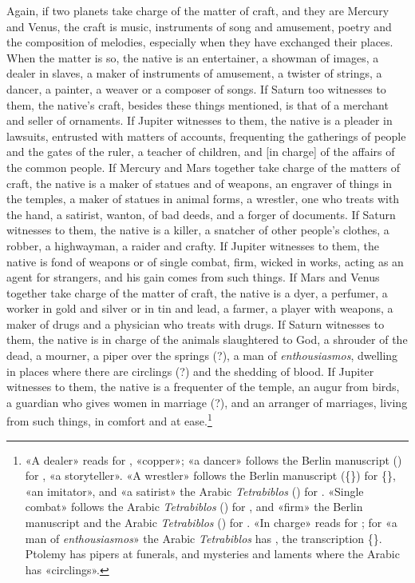 \documentclass[11pt]{article}
\newcommand{\Fol}[1]{\marginpar{\footnotesize\color{gray}f.\,#1}}
\begin{document}
\par \Fol{66r}Again, if two planets take charge of the matter of craft, and they are Mercury and Venus, the craft is music, instruments of song and amusement, poetry and the composition of melodies, especially when they have exchanged their places. When the matter is so, the native is an entertainer, a showman of images, a dealer in slaves, a maker of instruments of amusement, a twister of strings, a dancer, a painter, a weaver or a composer of songs. If Saturn too witnesses to them, the native's craft, besides these things mentioned, is that of a merchant and seller of ornaments. If Jupiter witnesses to them, the native is a pleader in lawsuits, entrusted with matters of accounts, frequenting the gatherings of people and the gates of the ruler, a teacher of children, and [in charge] of the affairs of the common people. If Mercury and Mars together take charge of the matters of craft, the native is a maker of statues and of weapons, an engraver of things in the temples, a maker of statues in animal forms, a wrestler, one who treats with the hand, a satirist, wanton, of bad deeds, and a forger of documents. If Saturn witnesses to them, the native is a killer, a snatcher of other people's clothes, a robber, a highwayman, a raider and crafty. If Jupiter witnesses to them, the native is fond of weapons or of single combat, firm, wicked in works, acting as an agent for strangers, and his gain comes from such things. If Mars and Venus together take charge of the matter of craft, the native is a dyer, a perfumer, a worker in gold and silver or in tin and lead, a farmer, a player with weapons, a maker of drugs and a physician who treats with drugs. If Saturn witnesses to them, the native is in charge of the animals slaughtered to God, a shrouder of the dead, a mourner, a piper over the springs (?), a man of \emph{enthousiasmos}, dwelling in places where there are circlings (?) and the shedding of blood. If Jupiter witnesses to them, the native is a frequenter of the temple, an augur from birds, a guardian who gives women in marriage (?), and an arranger of marriages, living from such things, in comfort and at ease.\footnote{«A dealer» reads  for , «copper»; «a dancer» follows the Berlin manuscript () for , «a storyteller». «A wrestler» follows the Berlin manuscript (\{\}) for \{\}, «an imitator», and «a satirist» the Arabic \emph{Tetrabiblos} () for . «Single combat» follows the Arabic \emph{Tetrabiblos} () for , and «firm» the Berlin manuscript and the Arabic \emph{Tetrabiblos} () for . «In charge» reads  for ; for «a man of \emph{enthousiasmos}» the Arabic \emph{Tetrabiblos} has , the transcription \{\}. Ptolemy has pipers at funerals, and mysteries and laments where the Arabic has «circlings».}\par
\end{document}
